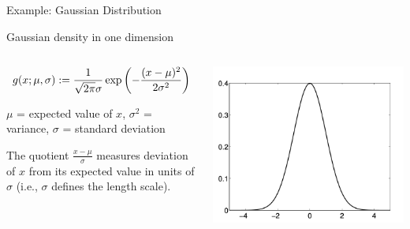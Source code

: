 \documentclass[10pt]{beamer}
\newcommand{\bp}[1]{\bigg(  {#1} \bigg)}
\begin{document}
\begin{frame}{Example: Gaussian Distribution}

\begin{sblock}{Gaussian density in one dimension}
\begin{columns}
\begin{column}{.55\textwidth}
\footnotesize
\[ g(x; \mu, \sigma) := \df{1}{\sqrt{2 \pi} \sigma} \exp \bp{ - \df{(x-\mu)^2}{2 \sigma^2}} \]
\begin{compactitem}
\item $\mu$ = expected value of $x$, $\sigma^2$ = variance, $\sigma$ =  standard deviation
\item The quotient $\frac{x - \mu}{\sigma}$ measures deviation of $x$ from its expected value in units of $\sigma$ (i.e., $\sigma$ defines the length scale).
\end{compactitem}
\end{column}
\begin{column}{.3\textwidth}
\includegraphics[width=\textwidth]{images/gaussian_1d}
\end{column}
\end{columns}
\end{sblock}


\end{frame}
\end{document}
